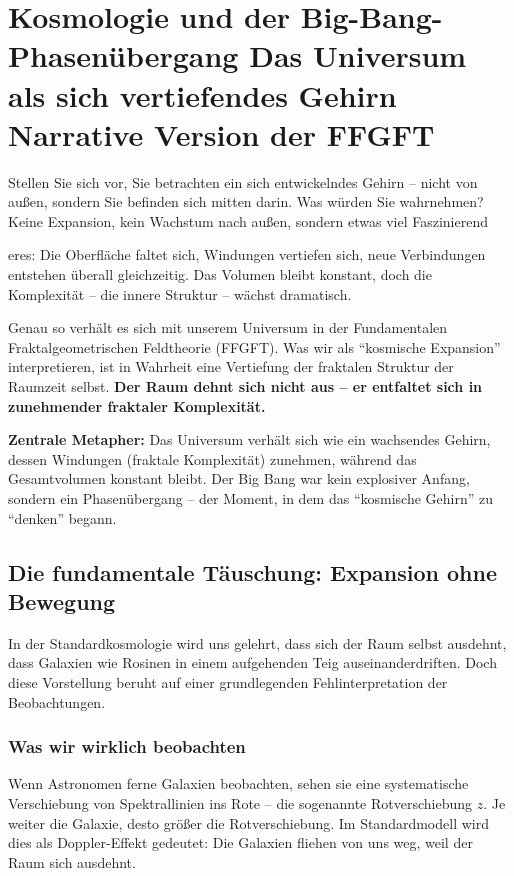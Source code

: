 \chapter{Kosmologie und der Big-Bang-Phasenübergang  Das Universum als sich vertiefendes Gehirn  Narrative Version der FFGFT}



Stellen Sie sich vor, Sie betrachten ein sich entwickelndes Gehirn -- nicht von außen, sondern Sie befinden sich mitten darin. Was würden Sie wahrnehmen? Keine Expansion, kein Wachstum nach außen, sondern etwas viel Faszinierend

eres: Die Oberfläche faltet sich, Windungen vertiefen sich, neue Verbindungen entstehen überall gleichzeitig. Das Volumen bleibt konstant, doch die Komplexität -- die innere Struktur -- wächst dramatisch.

Genau so verhält es sich mit unserem Universum in der Fundamentalen Fraktalgeometrischen Feldtheorie (FFGFT). Was wir als \enquote{kosmische Expansion} interpretieren, ist in Wahrheit eine Vertiefung der fraktalen Struktur der Raumzeit selbst. \textbf{Der Raum dehnt sich nicht aus -- er entfaltet sich in zunehmender fraktaler Komplexität.}

\textbf{Zentrale Metapher:} Das Universum verhält sich wie ein wachsendes Gehirn, dessen Windungen (fraktale Komplexität) zunehmen, während das Gesamtvolumen konstant bleibt. Der Big Bang war kein explosiver Anfang, sondern ein Phasenübergang -- der Moment, in dem das \enquote{kosmische Gehirn} zu \enquote{denken} begann.

\section{Die fundamentale Täuschung: Expansion ohne Bewegung}

In der Standardkosmologie wird uns gelehrt, dass sich der Raum selbst ausdehnt, dass Galaxien wie Rosinen in einem aufgehenden Teig auseinanderdriften. Doch diese Vorstellung beruht auf einer grundlegenden Fehlinterpretation der Beobachtungen.

\subsection{Was wir wirklich beobachten}

Wenn Astronomen ferne Galaxien beobachten, sehen sie eine systematische Verschiebung von Spektrallinien ins Rote -- die sogenannte Rotverschiebung $z$. Je weiter die Galaxie, desto größer die Rotverschiebung. Im Standardmodell wird dies als Doppler-Effekt gedeutet: Die Galaxien fliehen von uns weg, weil der Raum sich ausdehnt.

